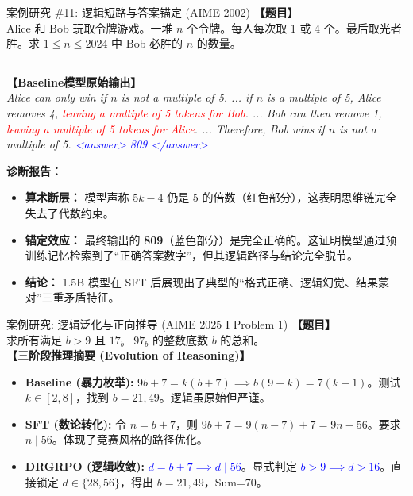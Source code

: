 \documentclass[11pt, a4paper]{article} %
\begin{document}
\begin{casebox}{案例研究 \#11: 逻辑短路与答案锚定 (AIME 2002)}
	\textbf{【题目】} \\
	Alice 和 Bob 玩取令牌游戏。一堆 $n$ 个令牌。每人每次取 1 或 4 个。最后取光者胜。求 $1 \le n \le 2024$ 中 Bob 必胜的 $n$ 的数量。
	
	\vspace{5pt}
	\hrule
	\vspace{5pt}
	
	\textbf{【Baseline模型原始输出】} \\
	\textit{Alice can only win if $n$ is not a multiple of 5. ... if $n$ is a multiple of 5, Alice removes 4, \textcolor{red}{leaving a multiple of 5 tokens for Bob}. ... Bob can then remove 1, \textcolor{red}{leaving a multiple of 5 tokens for Alice}. ... Therefore, Bob wins if $n$ is not a multiple of 5. \textcolor{blue}{<answer> 809 </answer>}}
	
	\vspace{5pt}
	\begin{tcolorbox}[colback=red!5!white, colframe=red!50!black, size=small]
		\textbf{诊断报告：}
		\begin{itemize}
			\item \textbf{算术断层：} 模型声称 $5k - 4$ 仍是 5 的倍数（红色部分），这表明思维链完全失去了代数约束。
			\item \textbf{锚定效应：} 最终输出的 \textbf{809}（蓝色部分）是完全正确的。这证明模型通过预训练记忆检索到了“正确答案数字”，但其逻辑路径与结论完全脱节。
			\item \textbf{结论：} 1.5B 模型在 SFT 后展现出了典型的“格式正确、逻辑幻觉、结果蒙对”三重矛盾特征。
		\end{itemize}
	\end{tcolorbox}
\end{casebox}

\begin{casebox}{案例研究: 逻辑泛化与正向推导 (AIME 2025 I Problem 1)}
	\textbf{【题目】} \\
	求所有满足 $b > 9$ 且 $17_b \mid 97_b$ 的整数底数 $b$ 的总和。\\
	\textbf{【三阶段推理摘要 (Evolution of Reasoning)】}
	\begin{itemize}
		\item \textbf{Baseline (暴力枚举):} $9b + 7 = k(b + 7) \implies b(9-k) = 7(k-1)$。测试 $k \in [2, 8]$，找到 $b=21, 49$。逻辑虽原始但严谨。
		\item \textbf{SFT (数论转化):} 令 $n = b+7$，则 $9b+7 = 9(n-7)+7 = 9n - 56$。要求 $n \mid 56$。体现了竞赛风格的路径优化。
		\item \textbf{DRGRPO (逻辑收敛):} \textcolor{blue}{$d = b+7 \implies d \mid 56$}。显式判定 \textcolor{blue}{$b > 9 \implies d > 16$}。直接锁定 $d \in \{28, 56\}$，得出 $b=21, 49$，Sum=70。
	\end{itemize}
\end{casebox}
\end{document}

